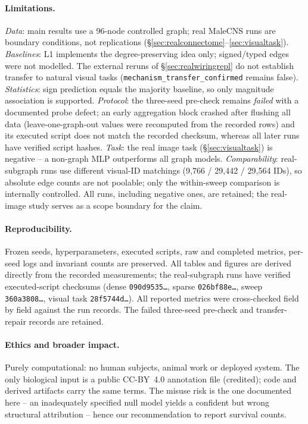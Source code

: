 \documentclass[10pt,twocolumn,letterpaper]{article}
\begin{document}
\paragraph{Limitations.}
\emph{Data}: main results use a 96-node controlled graph; real MaleCNS runs
are boundary conditions, not replications
(\S\ref{sec:realconnectome}--\ref{sec:visualtask}). \emph{Baselines}: L1 implements the
degree-preserving idea only; signed/typed edges were not modelled. The external
reruns of \S\ref{sec:realwiringrepl} do not establish transfer to natural
visual tasks (\texttt{mechanism\_transfer\_confirmed} remains false).
\emph{Statistics}: sign prediction equals the majority baseline, so only
magnitude association is supported. \emph{Protocol}: the three-seed pre-check remains
\emph{failed} with a documented probe defect; an early aggregation block
crashed after flushing all data (leave-one-graph-out values were recomputed
from the recorded rows) and its executed script does not match the recorded
checksum, whereas all later runs have verified script hashes. \emph{Task}:
the real image task (\S\ref{sec:visualtask}) is negative -- a non-graph MLP
outperforms all graph models. \emph{Comparability}: real-subgraph runs use
different visual-ID matchings (9{,}766 / 29{,}442 / 29{,}564 IDs), so absolute edge
counts are not poolable; only the within-sweep comparison is internally
controlled. All runs, including negative ones, are retained; the real-image
study serves as a scope boundary for the claim.

\paragraph{Reproducibility.}
Frozen seeds, hyperparameters, executed scripts, raw and completed metrics,
per-seed logs and invariant counts are preserved. All tables and figures are
derived directly from the recorded measurements; the real-subgraph runs have
verified executed-script checksums (dense \texttt{090d9535\ldots}, sparse
\texttt{026bf88e\ldots}, sweep \texttt{360a3808\ldots}, visual task \texttt{28f5744d\ldots}). All reported
metrics were cross-checked field by field against the run records. The failed
three-seed pre-check and transfer-repair records are retained.

\paragraph{Ethics and broader impact.}
Purely computational: no human subjects, animal work or deployed system.
The only biological input is a public CC-BY~4.0 annotation file (credited);
code and derived artifacts carry the same terms. The misuse risk is the one
documented here -- an inadequately specified null model yields a confident but
wrong structural attribution -- hence our recommendation to report survival
counts.
\end{document}
